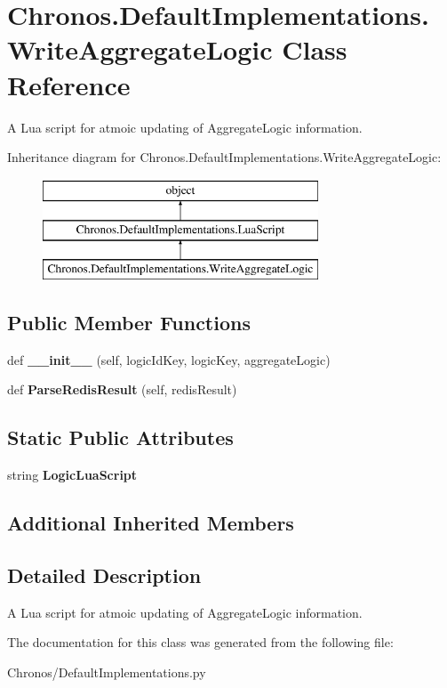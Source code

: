 \hypertarget{classChronos_1_1DefaultImplementations_1_1WriteAggregateLogic}{}\section{Chronos.\+Default\+Implementations.\+Write\+Aggregate\+Logic Class Reference}
\label{classChronos_1_1DefaultImplementations_1_1WriteAggregateLogic}


A Lua script for atmoic updating of Aggregate\+Logic information.  


Inheritance diagram for Chronos.\+Default\+Implementations.\+Write\+Aggregate\+Logic\+:\begin{figure}[H]
\begin{center}
\leavevmode
\includegraphics[height=3.000000cm]{classChronos_1_1DefaultImplementations_1_1WriteAggregateLogic}
\end{center}
\end{figure}
\subsection*{Public Member Functions}
\begin{DoxyCompactItemize}
\item 
def {\bfseries \+\_\+\+\_\+init\+\_\+\+\_\+} (self, logic\+Id\+Key, logic\+Key, aggregate\+Logic)
\item 
def {\bfseries Parse\+Redis\+Result} (self, redis\+Result)
\end{DoxyCompactItemize}
\subsection*{Static Public Attributes}
\begin{DoxyCompactItemize}
\item 
string {\bfseries Logic\+Lua\+Script}
\end{DoxyCompactItemize}
\subsection*{Additional Inherited Members}


\subsection{Detailed Description}
A Lua script for atmoic updating of Aggregate\+Logic information. 

The documentation for this class was generated from the following file\+:\begin{DoxyCompactItemize}
\item 
Chronos/Default\+Implementations.\+py\end{DoxyCompactItemize}
